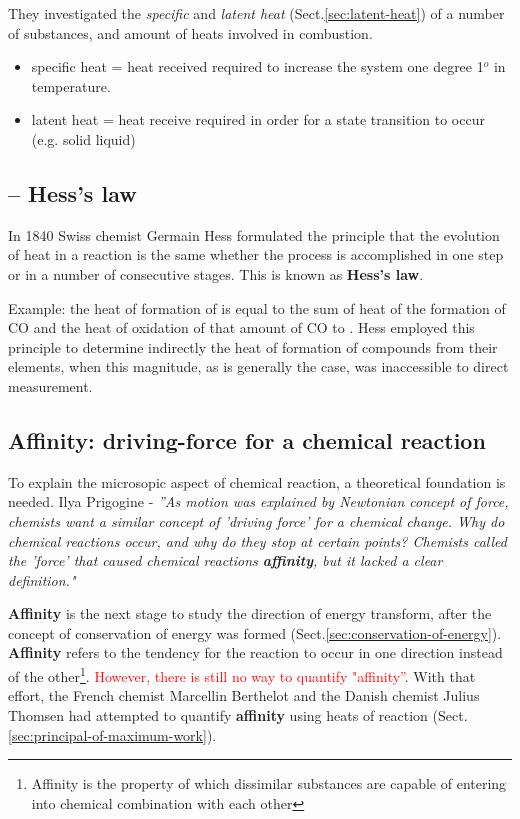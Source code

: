 They investigated the {\it specific} and {\it latent heat}
(Sect.\ref{sec:latent-heat}) of a number of substances, and amount of heats
involved in combustion.

\begin{itemize}

\item specific heat = heat received required to increase the system one degree
1$^o$ in temperature.
 
\item latent heat = heat receive required in order for a state transition
  to occur (e.g. solid \ce{->} liquid)
\end{itemize}

\subsection{-- Hess's law}
\label{sec:Hess-law}

In 1840 Swiss chemist Germain Hess formulated the principle that the evolution
of heat in a reaction is the same whether the process is accomplished in one
step or in a number of consecutive stages. This is known as {\bf Hess's law}.

Example: the heat of formation of  is equal to the sum of heat of the
formation of CO and the heat of oxidation of that amount of CO to . Hess
employed this principle to determine indirectly the heat of formation of
compounds from their elements, when this magnitude, as is generally the case,
was inaccessible to direct measurement.



\subsection[Berthelot and Thomsen: affinity]{Affinity: driving-force for a
chemical reaction}
\label{sec:affinity}

To explain the microsopic aspect of chemical reaction, a theoretical foundation
is needed.  Ilya Prigogine - {\it ''As motion was explained by Newtonian concept
of force, chemists  want a similar concept of 'driving force' for a chemical
change. Why do chemical reactions occur, and why do they stop at certain points?
Chemists called the 'force' that caused chemical reactions {\bf affinity}, but
it lacked a clear definition."} 

{\bf Affinity} is the next stage to study the direction of energy transform,
after the concept of conservation of energy was formed
(Sect.\ref{sec:conservation-of-energy}).
{\bf Affinity} refers to the tendency for the reaction to occur in one direction
instead of the other\footnote{Affinity is the property of which dissimilar
substances are capable of entering into chemical combination with each other}.
\textcolor{red}{However, there is still no way to quantify "affinity''}.
With that effort, the French chemist Marcellin Berthelot and the Danish chemist
Julius Thomsen had attempted to quantify {\bf affinity} using heats of reaction
(Sect.\ref{sec:principal-of-maximum-work}).

